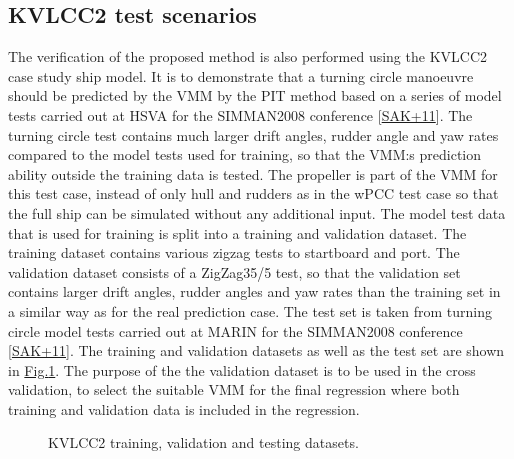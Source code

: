 \documentclass[review]{elsarticle}
\begin{document}
\subsection{KVLCC2 test scenarios}
\label{\detokenize{05.01_case_studies:kvlcc2-test-scenarios}}
\sphinxAtStartPar
The verification of the proposed method is also performed using the KVLCC2 case study ship model. It is to demonstrate that a turning circle manoeuvre should be predicted by the VMM by the PIT method based on a series of model tests carried out at HSVA for the SIMMAN2008 conference {[}\hyperlink{cite.bibligraphy:id79}{SAK+11}{]}. The turning circle test contains much larger drift angles, rudder angle and yaw rates compared to the model tests used for training, so that
the VMM:s prediction ability outside the training data is tested.
The propeller is part of the VMM for this test case, instead of only hull and rudders as in the wPCC test case so that the full ship can be simulated without any additional input.
The model test data that is used for training is split into a training and validation dataset. The training dataset contains various zigzag tests to startboard and port. The validation dataset consists of a ZigZag35/5 test, so that the validation set contains larger drift angles, rudder angles and yaw rates than the training set in a similar way as for the real prediction case. The test set is taken from turning circle model tests carried out at MARIN for the SIMMAN2008 conference {[}\hyperlink{cite.bibligraphy:id79}{SAK+11}{]}. The training and validation datasets as well as the test set are shown in \hyperref[\detokenize{05.01_case_studies:fig-kvlcc2-traintest}]{Fig.\@ \ref{\detokenize{05.01_case_studies:fig-kvlcc2-traintest}}}.
The purpose of the the validation dataset is to be used in the cross validation, to select the suitable VMM for the final regression where both training and validation data is included in the regression.

\begin{figure}[H]
\centering
\capstart

\noindent{}
\caption{KVLCC2 training, validation and testing datasets.}\label{\detokenize{05.01_case_studies:fig-kvlcc2-traintest}}\end{figure}
\end{document}
